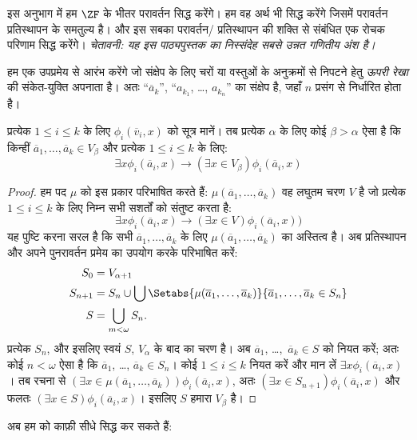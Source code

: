 \documentclass[../../../include/open-logic-section]{subfiles}
\begin{document}

इस अनुभाग में हम $\ZF$ के भीतर परावर्तन सिद्ध करेंगे। हम वह अर्थ भी सिद्ध
करेंगे जिसमें परावर्तन प्रतिस्थापन के समतुल्य है। और इस सबका परावर्तन/
प्रतिस्थापन की शक्ति से संबंधित एक रोचक परिणाम सिद्ध करेंगे। \emph{चेतावनी:
यह इस पाठ्यपुस्तक का निस्संदेह सबसे उन्नत गणितीय अंश है।}

हम एक उपप्रमेय से आरंभ करेंगे जो संक्षेप के लिए चरों या वस्तुओं के अनुक्रमों
से निपटने हेतु \emph{ऊपरी रेखा} की संकेत-युक्ति अपनाता है। अतः
``$\overline{a}_k$'', ``$a_{k_1}$, \dots, $a_{k_n}$'' का संक्षेप है, जहाँ
$n$ प्रसंग से निर्धारित होता है।

\begin{lem}
प्रत्येक $1 \leq i \leq k$ के लिए $\phi_i(\overline{v}_i, x)$ को सूत्र
मानें। तब प्रत्येक $\alpha$ के लिए कोई $\beta > \alpha$ ऐसा है कि किन्हीं
$\overline{a}_1, \ldots, \overline{a}_k \in V_\beta$ और प्रत्येक
$1 \leq i \leq k$ के लिए:
\[
	\exists x\phi_i(\overline{a}_i, x) \rightarrow (\exists x \in V_\beta) \phi_i(\overline{a}_i, x)
\]
\end{lem}

\begin{proof}
हम पद $\mu$ को इस प्रकार परिभाषित करते हैं:
$\mu(\overline{a}_1, \ldots, \overline{a}_k)$ वह लघुतम चरण $V$ है जो
प्रत्येक $1 \leq i \leq k$ के लिए निम्न सभी सशर्तों को संतुष्ट करता है:
\[
\exists x\phi_i(\overline{a}_i, x) \rightarrow (\exists x \in V) \phi_i(\overline{a}_i, x))
\]
यह पुष्टि करना सरल है कि सभी
$\overline{a}_1, \ldots, \overline{a}_k$ के लिए
$\mu(\overline{a}_1, \ldots, \overline{a}_k)$ का अस्तित्व है। अब
प्रतिस्थापन और अपने पुनरावर्तन प्रमेय का उपयोग करके परिभाषित करें:
\begin{align*}
	S_0 & = V_{\alpha+1}\\
	S_{n+1} & = S_n \cup \bigcup
	\Setabs{\mu(\overline{a}_1, \ldots, \overline{a}_k)}
	{\overline{a}_1, \ldots, \overline{a}_k \in S_n} \\
	S &= \bigcup_{m < \omega} S_n.
\end{align*}
प्रत्येक $S_n$, और इसलिए स्वयं $S$, $V_\alpha$ के बाद का चरण है। अब
$\overline{a}_1$, \dots,~$\overline{a}_k \in S$ को नियत करें; अतः कोई
$n < \omega$ ऐसा है कि
$\overline{a}_1$, \dots, $\overline{a}_k \in S_n$। कोई
$1 \leq i \leq k$ नियत करें और मान लें
$\exists x \phi_i(\overline{a}_i,x)$। तब रचना से
$(\exists x \in \mu(\overline{a}_1, \ldots,
\overline{a}_k))\phi_i(\overline{a}_i, x)$, अतः
$(\exists x \in S_{n+1})\phi_i(\overline{a}_i, x)$ और फलतः
$(\exists x \in S)\phi_i(\overline{a}_i, x)$। इसलिए $S$ हमारा
$V_\beta$ है।
\end{proof}
\noindent 
अब हम  को काफ़ी सीधे सिद्ध
कर सकते हैं:
\end{document}
